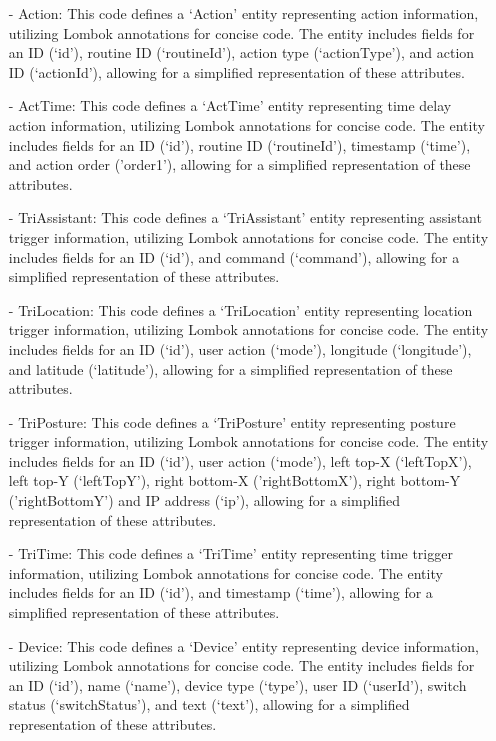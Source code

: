 \begin{enumerate}
    \item[-] Action: This code defines a ‘Action' entity representing action information, utilizing Lombok annotations for concise code. The entity includes fields for an ID (‘id’), routine ID (‘routineId’), action type (‘actionType’), and action ID (‘actionId’), allowing for a simplified representation of these attributes. \\
    \item[-] ActTime: This code defines a ‘ActTime' entity representing time delay action information, utilizing Lombok annotations for concise code. The entity includes fields for an ID (‘id’), routine ID (‘routineId’), timestamp (‘time’), and action order ('order1'), allowing for a simplified representation of these attributes.\\
    \item[-] TriAssistant: This code defines a ‘TriAssistant' entity representing assistant trigger information, utilizing Lombok annotations for concise code. The entity includes fields for an ID (‘id’), and command (‘command’), allowing for a simplified representation of these attributes.\\
    \item[-] TriLocation: This code defines a ‘TriLocation' entity representing location trigger information, utilizing Lombok annotations for concise code. The entity includes fields for an ID (‘id’), user action (‘mode’), longitude (‘longitude’), and latitude (‘latitude’), allowing for a simplified representation of these attributes.\\
    \item[-] TriPosture: This code defines a ‘TriPosture' entity representing posture trigger information, utilizing Lombok annotations for concise code. The entity includes fields for an ID (‘id’), user action (‘mode’), left top-X (‘leftTopX’), left top-Y (‘leftTopY’), right bottom-X ('rightBottomX'), right bottom-Y ('rightBottomY') and IP address (‘ip’), allowing for a simplified representation of these attributes. \\
    \item[-] TriTime: This code defines a ‘TriTime' entity representing time trigger information, utilizing Lombok annotations for concise code. The entity includes fields for an ID (‘id’), and timestamp (‘time’), allowing for a simplified representation of these attributes.\\
    \item[-] Device: This code defines a ‘Device' entity representing device information, utilizing Lombok annotations for concise code. The entity includes fields for an ID (‘id’), name (‘name’), device type (‘type’), user ID (‘userId’), switch status (‘switchStatus’), and text (‘text’), allowing for a simplified representation of these attributes.\\

\end{enumerate}
